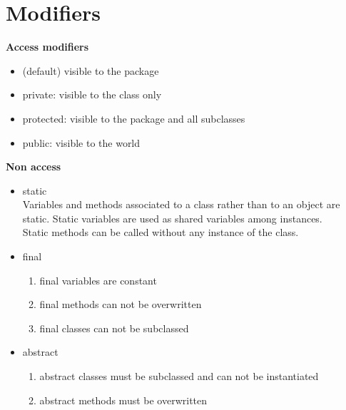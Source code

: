 \documentclass[10pt,a4paper]{book}
\begin{document}
\section{Modifiers}
\textbf{Access modifiers}
\begin{itemize}
\item (default) visible to the package
\item private: visible to the class only
\item protected: visible to the package and all subclasses
\item public: visible to the world
\end{itemize}
\textbf{Non access}
\begin{itemize}
\item static\\
Variables and methods associated to a class rather than to an object are static. Static variables are used as shared variables among instances.\\
Static methods can be called without any instance of the class.
\item final
\begin{enumerate}
\item final variables are constant
\item final methods can not be overwritten
\item final classes can not be subclassed
\end{enumerate}
\item abstract
\begin{enumerate}
\item abstract classes must be subclassed and can not be instantiated
\item abstract methods must be overwritten
\end{enumerate}
\end{itemize}
\newpage
\end{document}

